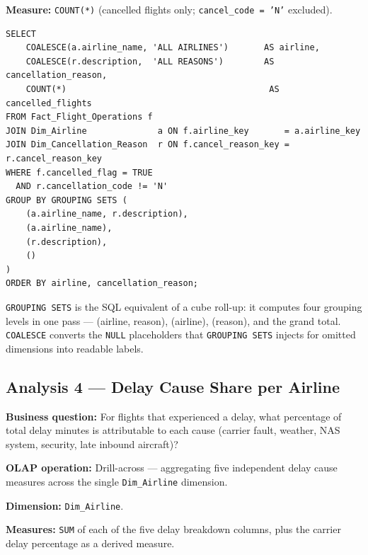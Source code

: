 \documentclass[12pt,a4paper]{article}
\begin{document}
\textbf{Measure:} \texttt{COUNT(*)} (cancelled flights only;
\texttt{cancel\_code = 'N'} excluded).

\begin{lstlisting}[style=sql]
SELECT
    COALESCE(a.airline_name, 'ALL AIRLINES')       AS airline,
    COALESCE(r.description,  'ALL REASONS')        AS cancellation_reason,
    COUNT(*)                                        AS cancelled_flights
FROM Fact_Flight_Operations f
JOIN Dim_Airline              a ON f.airline_key       = a.airline_key
JOIN Dim_Cancellation_Reason  r ON f.cancel_reason_key = r.cancel_reason_key
WHERE f.cancelled_flag = TRUE
  AND r.cancellation_code != 'N'
GROUP BY GROUPING SETS (
    (a.airline_name, r.description),
    (a.airline_name),
    (r.description),
    ()
)
ORDER BY airline, cancellation_reason;
\end{lstlisting}

\texttt{GROUPING SETS} is the SQL equivalent of a cube roll-up: it computes
four grouping levels in one pass — (airline, reason), (airline), (reason),
and the grand total. \texttt{COALESCE} converts the \texttt{NULL} placeholders
that \texttt{GROUPING SETS} injects for omitted dimensions into readable
labels.

\subsection{Analysis 4 — Delay Cause Share per Airline}

\textbf{Business question:} For flights that experienced a delay, what
percentage of total delay minutes is attributable to each cause (carrier
fault, weather, NAS system, security, late inbound aircraft)?

\textbf{OLAP operation:} Drill-across — aggregating five independent delay
cause measures across the single \texttt{Dim\_Airline} dimension.

\textbf{Dimension:} \texttt{Dim\_Airline}.

\textbf{Measures:} \texttt{SUM} of each of the five delay breakdown columns,
plus the carrier delay percentage as a derived measure.
\end{document}
